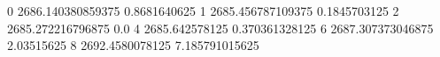 0 2686.140380859375 0.8681640625
1 2685.456787109375 0.1845703125
2 2685.272216796875 0.0
4 2685.642578125 0.370361328125
6 2687.307373046875 2.03515625
8 2692.4580078125 7.185791015625
